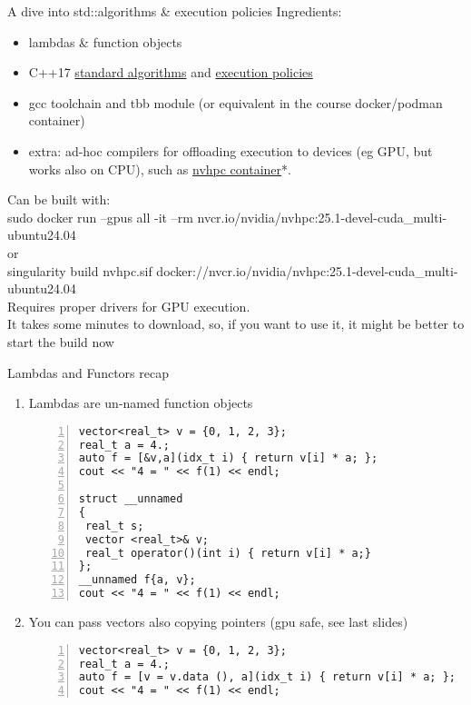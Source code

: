 \documentclass[10pt,aspectratio=169]{beamer}
\begin{document}
\begin{frame}{A dive into std::algorithms \& execution policies}
Ingredients:
    \begin{itemize}
        \item lambdas \& function objects
        \item C++17 \href{https://en.cppreference.com/w/cpp/algorithm}{\color{blue}standard algorithms} and \href{https://en.cppreference.com/w/cpp/algorithm/execution_policy_tag_t}{\color{blue} execution policies}
        \item gcc toolchain and tbb module (or equivalent in the course docker/podman container)
        \item extra: ad-hoc compilers for offloading execution to devices (eg GPU, but works also on CPU), such as \href{https://catalog.ngc.nvidia.com/orgs/nvidia/containers/nvhpc}{\color{blue}nvhpc container}*.
    \end{itemize}
    \vfill
    {\footnotesize *Can be built with:\\
    {\ttfamily sudo docker run --gpus all -it --rm nvcr.io/nvidia/nvhpc:25.1-devel-cuda\_multi-ubuntu24.04} \\
    or \\
    {\ttfamily singularity build nvhpc.sif docker://nvcr.io/nvidia/nvhpc:25.1-devel-cuda\_multi-ubuntu24.04}\\
    Requires proper drivers for GPU execution.\\
    It takes some minutes to download, so, if you want to use it, it might be better to start the build now}
\end{frame}

\begin{frame}[fragile]{Lambdas and Functors recap}
    \begin{enumerate}
        \item Lambdas are un-named function objects
\begin{lstlisting}[frame=single, style=cpp, firstnumber=1, numbers=left, numberstyle=\tiny,showtabs=false,xleftmargin=.05\linewidth,xrightmargin=.025\linewidth]
vector<real_t> v = {0, 1, 2, 3};
real_t a = 4.;
auto f = [&v,a](idx_t i) { return v[i] * a; };
cout << "4 = " << f(1) << endl;

struct __unnamed 
{
 real_t s;
 vector <real_t>& v;
 real_t operator()(int i) { return v[i] * a;}
};
__unnamed f{a, v};
cout << "4 = " << f(1) << endl;
\end{lstlisting}
\item You can pass vectors also copying pointers (gpu safe, see last slides)
        \begin{lstlisting}[frame=single, style=cpp, firstnumber=1, numbers=left, numberstyle=\tiny,showtabs=false,xleftmargin=.05\linewidth,xrightmargin=.025\linewidth]
vector<real_t> v = {0, 1, 2, 3};
real_t a = 4.;
auto f = [v = v.data (), a](idx_t i) { return v[i] * a; };
cout << "4 = " << f(1) << endl;
\end{lstlisting}
    \end{enumerate}
\end{frame}
\end{document}

